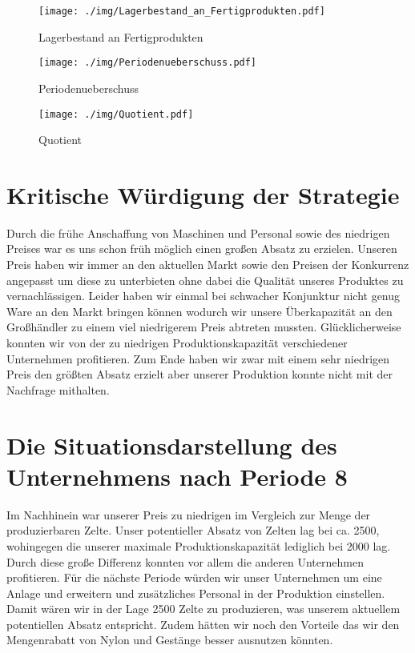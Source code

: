 \documentclass[a4paper, 12pt]{report}
\begin{document}
\begin{flushleft}
 \begin{figure}
 \centering 
 \texttt{[image: ./img/Lagerbestand\_an\_Fertigprodukten.pdf]}
  \caption[Lagerbestand an Fertigprodukten]{Lagerbestand an Fertigprodukten}
\end{figure}

\begin{figure}
 \centering 
 \texttt{[image: ./img/Periodenueberschuss.pdf]}
  \caption[Periodenueberschuss]{Periodenueberschuss}
\end{figure}
 
 \begin{figure}[b]
 \centering 
 \texttt{[image: ./img/Quotient.pdf]}
  \caption[Quotient]{Quotient}
\end{figure}



\chapter{Kritische Würdigung der Strategie}
Durch die frühe Anschaffung von Maschinen und Personal sowie des niedrigen Preises war es uns schon früh möglich einen großen Absatz zu erzielen.
Unseren Preis haben wir immer an den aktuellen Markt sowie den Preisen der Konkurrenz angepasst um diese zu unterbieten ohne dabei die Qualität unseres Produktes zu vernachlässigen.
Leider haben wir einmal bei schwacher Konjunktur nicht genug Ware an den Markt bringen können wodurch wir unsere Überkapazität an den Großhändler zu einem viel niedrigerem Preis abtreten mussten.
Glücklicherweise konnten wir von der zu niedrigen Produktionskapazität verschiedener Unternehmen profitieren.
Zum Ende haben wir zwar mit einem sehr niedrigen Preis den größten Absatz erzielt aber unserer Produktion konnte nicht mit der Nachfrage mithalten.

\chapter{Die Situationsdarstellung des Unternehmens nach Periode 8}  
Im Nachhinein war unserer Preis zu niedrigen im Vergleich zur Menge der produzierbaren Zelte.
Unser potentieller Absatz von Zelten lag bei ca. 2500, wohingegen die unserer maximale Produktionskapazität lediglich bei 2000 lag.
Durch diese große Differenz konnten vor allem die anderen Unternehmen profitieren.
Für die nächste Periode würden wir unser Unternehmen um eine Anlage und erweitern und zusätzliches Personal in der Produktion einstellen.
Damit wären wir in der Lage 2500 Zelte zu produzieren, was unserem aktuellem potentiellen Absatz entspricht.
Zudem hätten wir noch den Vorteile das wir den Mengenrabatt von Nylon und Gestänge besser ausnutzen könnten.


\end{flushleft}
\end{document}
